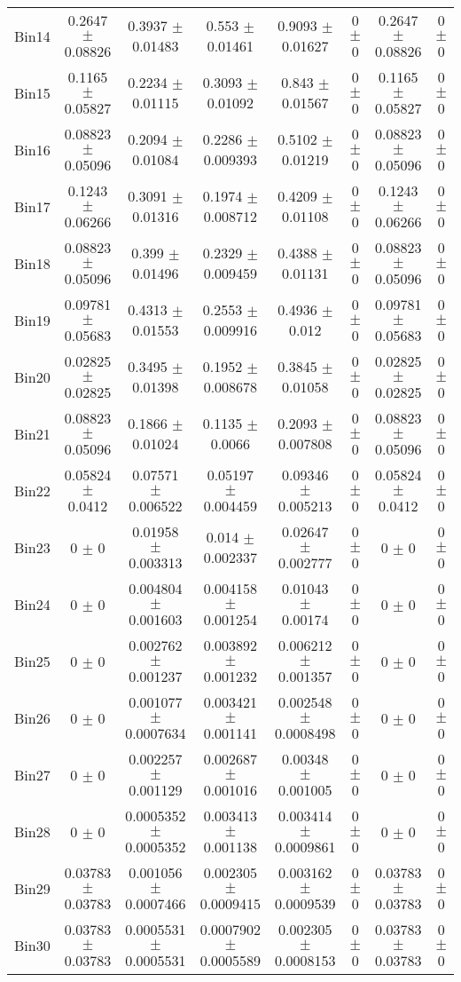 \begin{tabular}{@{\extracolsep{4pt}}lccccccc@{}}
     Bin14 & 0.2647 $\pm$ 0.08826 & 0.3937 $\pm$ 0.01483 & 0.553 $\pm$ 0.01461 & 0.9093 $\pm$ 0.01627 & 0 $\pm$ 0 & 0.2647 $\pm$ 0.08826 & 0 $\pm$ 0 \\ 
     Bin15 & 0.1165 $\pm$ 0.05827 & 0.2234 $\pm$ 0.01115 & 0.3093 $\pm$ 0.01092 & 0.843 $\pm$ 0.01567 & 0 $\pm$ 0 & 0.1165 $\pm$ 0.05827 & 0 $\pm$ 0 \\ 
     Bin16 & 0.08823 $\pm$ 0.05096 & 0.2094 $\pm$ 0.01084 & 0.2286 $\pm$ 0.009393 & 0.5102 $\pm$ 0.01219 & 0 $\pm$ 0 & 0.08823 $\pm$ 0.05096 & 0 $\pm$ 0 \\ 
     Bin17 & 0.1243 $\pm$ 0.06266 & 0.3091 $\pm$ 0.01316 & 0.1974 $\pm$ 0.008712 & 0.4209 $\pm$ 0.01108 & 0 $\pm$ 0 & 0.1243 $\pm$ 0.06266 & 0 $\pm$ 0 \\ 
     Bin18 & 0.08823 $\pm$ 0.05096 & 0.399 $\pm$ 0.01496 & 0.2329 $\pm$ 0.009459 & 0.4388 $\pm$ 0.01131 & 0 $\pm$ 0 & 0.08823 $\pm$ 0.05096 & 0 $\pm$ 0 \\ 
     Bin19 & 0.09781 $\pm$ 0.05683 & 0.4313 $\pm$ 0.01553 & 0.2553 $\pm$ 0.009916 & 0.4936 $\pm$ 0.012 & 0 $\pm$ 0 & 0.09781 $\pm$ 0.05683 & 0 $\pm$ 0 \\ 
     Bin20 & 0.02825 $\pm$ 0.02825 & 0.3495 $\pm$ 0.01398 & 0.1952 $\pm$ 0.008678 & 0.3845 $\pm$ 0.01058 & 0 $\pm$ 0 & 0.02825 $\pm$ 0.02825 & 0 $\pm$ 0 \\ 
     Bin21 & 0.08823 $\pm$ 0.05096 & 0.1866 $\pm$ 0.01024 & 0.1135 $\pm$ 0.0066 & 0.2093 $\pm$ 0.007808 & 0 $\pm$ 0 & 0.08823 $\pm$ 0.05096 & 0 $\pm$ 0 \\ 
     Bin22 & 0.05824 $\pm$ 0.0412 & 0.07571 $\pm$ 0.006522 & 0.05197 $\pm$ 0.004459 & 0.09346 $\pm$ 0.005213 & 0 $\pm$ 0 & 0.05824 $\pm$ 0.0412 & 0 $\pm$ 0 \\ 
     Bin23 & 0 $\pm$ 0 & 0.01958 $\pm$ 0.003313 & 0.014 $\pm$ 0.002337 & 0.02647 $\pm$ 0.002777 & 0 $\pm$ 0 & 0 $\pm$ 0 & 0 $\pm$ 0 \\ 
     Bin24 & 0 $\pm$ 0 & 0.004804 $\pm$ 0.001603 & 0.004158 $\pm$ 0.001254 & 0.01043 $\pm$ 0.00174 & 0 $\pm$ 0 & 0 $\pm$ 0 & 0 $\pm$ 0 \\ 
     Bin25 & 0 $\pm$ 0 & 0.002762 $\pm$ 0.001237 & 0.003892 $\pm$ 0.001232 & 0.006212 $\pm$ 0.001357 & 0 $\pm$ 0 & 0 $\pm$ 0 & 0 $\pm$ 0 \\ 
     Bin26 & 0 $\pm$ 0 & 0.001077 $\pm$ 0.0007634 & 0.003421 $\pm$ 0.001141 & 0.002548 $\pm$ 0.0008498 & 0 $\pm$ 0 & 0 $\pm$ 0 & 0 $\pm$ 0 \\ 
     Bin27 & 0 $\pm$ 0 & 0.002257 $\pm$ 0.001129 & 0.002687 $\pm$ 0.001016 & 0.00348 $\pm$ 0.001005 & 0 $\pm$ 0 & 0 $\pm$ 0 & 0 $\pm$ 0 \\ 
     Bin28 & 0 $\pm$ 0 & 0.0005352 $\pm$ 0.0005352 & 0.003413 $\pm$ 0.001138 & 0.003414 $\pm$ 0.0009861 & 0 $\pm$ 0 & 0 $\pm$ 0 & 0 $\pm$ 0 \\ 
     Bin29 & 0.03783 $\pm$ 0.03783 & 0.001056 $\pm$ 0.0007466 & 0.002305 $\pm$ 0.0009415 & 0.003162 $\pm$ 0.0009539 & 0 $\pm$ 0 & 0.03783 $\pm$ 0.03783 & 0 $\pm$ 0 \\ 
     Bin30 & 0.03783 $\pm$ 0.03783 & 0.0005531 $\pm$ 0.0005531 & 0.0007902 $\pm$ 0.0005589 & 0.002305 $\pm$ 0.0008153 & 0 $\pm$ 0 & 0.03783 $\pm$ 0.03783 & 0 $\pm$ 0 \\ 
\hline\hline
  \end{tabular}
